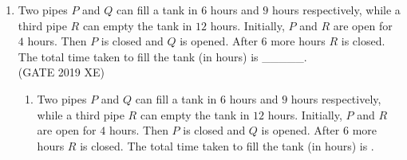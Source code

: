 \documentclass[journal,12pt,onecolumn]{IEEEtran}
\begin{document}
\begin{enumerate}
\hfill{(GATE 2019 XE)} 
\begin{multicols}{2}
<<<<<<< HEAD
\end{multicols}

\newpage

\item Two pipes $P$ and $Q$ can fill a tank in $6$ hours and $9$ hours respectively, while a third pipe $R$ can empty the tank in $12$ hours. Initially, $P$ and $R$ are open for $4$ hours. Then $P$ is closed and $Q$ is opened. After $6$ more hours $R$ is closed. The total time taken to fill the tank (in hours) is \_\_\_\_\_.\\

\hfill{(GATE 2019 XE)} 
\begin{multicols}{2}
\begin{enumerate}
=======

\vspace{0.5cm}

\item Two pipes $P$ and $Q$ can fill a tank in $6$ hours and $9$ hours respectively, while a third pipe $R$ can empty the tank in $12$ hours. Initially, $P$ and $R$ are open for $4$ hours. Then $P$ is closed and $Q$ is opened. After $6$ more hours $R$ is closed. The total time taken to fill the tank (in hours) is \underline{\hspace{2cm}}.
\vspace{0.2cm}
\hfill{} \\


\end{enumerate}
\end{multicols}
\end{enumerate}
\end{document}
